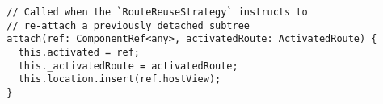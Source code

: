 \begin{verbatim}
  // Called when the `RouteReuseStrategy` instructs to
  // re-attach a previously detached subtree
  attach(ref: ComponentRef<any>, activatedRoute: ActivatedRoute) {
    this.activated = ref;
    this._activatedRoute = activatedRoute;
    this.location.insert(ref.hostView);
  }
\end{verbatim}
